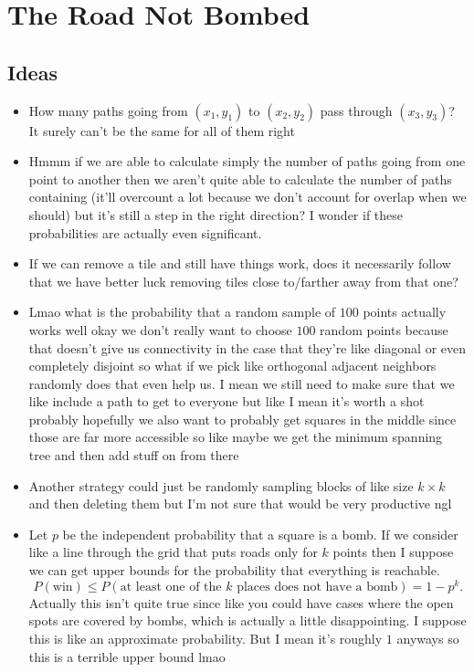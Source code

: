 \documentclass[a4paper, 12pt]{article}
\begin{document}
\section*{The Road Not Bombed}

\subsection*{Ideas}

\begin{itemize}
    \item How many paths going from \( (x_1, y_1) \) to \( (x_2, y_2) \) pass through \( (x_3, y_3) \)? It surely can't be the same for all of them right
    \item Hmmm if we are able to calculate simply the number of paths going from one point to another then we aren't quite able to calculate the number of paths containing (it'll overcount a lot because we don't account for overlap when we should) but it's still a step in the right direction? I wonder if these probabilities are actually even significant.
    \item If we can remove a tile and still have things work, does it necessarily follow that we have better luck removing tiles close to/farther away from that one?
    \item Lmao what is the probability that a random sample of \( 100 \) points actually works well okay we don't really want to choose \( 100 \) random points because that doesn't give us connectivity in the case that they're like diagonal or even completely disjoint so what if we pick like orthogonal adjacent neighbors randomly does that even help us. I mean we still need to make sure that we like include a path to get to everyone but like I mean it's worth a shot probably hopefully we also want to probably get squares in the middle since those are far more accessible so like maybe we get the minimum spanning tree and then add stuff on from there
    \item Another strategy could just be randomly sampling blocks of like size \( k \times k \) and then deleting them but I'm not sure that would be very productive ngl
    \item Let \( p \) be the independent probability that a square is a bomb. If we consider like a line through the grid that puts roads only for \( k \) points then I suppose we can get upper bounds for the probability that everything is reachable.
        \[
            P(\text{win}) \le P(\text{at least one of the } k \text{ places does not have a bomb}) = 1 - p^k
        .\]
        Actually this isn't quite true since like you could have cases where the open spots are covered by bombs, which is actually a little disappointing. I suppose this is like an approximate probability. But I mean it's roughly \( 1 \) anyways so this is a terrible upper bound lmao


\end{itemize}
\end{document}
